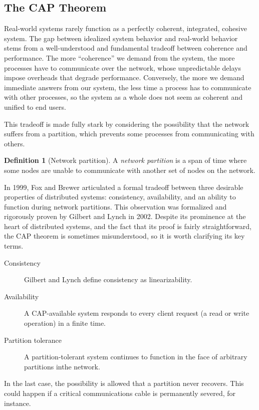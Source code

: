 \documentclass[]             %
{NASA}                       %
\theoremstyle{definition}
\newtheorem{definition}[theorem]{Definition}
\begin{document}
\subsection{The CAP Theorem}
Real-world systems rarely function as a perfectly coherent,
integrated, cohesive system. The gap between idealized system behavior
and real-world behavior stems from a well-understood and fundamental
tradeoff between coherence and performance. The more ``coherence'' we
demand from the system, the more processes have to communicate over
the network, whose unpredictable delays impose overheads that degrade
performance. Conversely, the more we demand immediate answers from our
system, the less time a process has to communicate with other
processes, so the system as a whole does not seem as coherent and
unified to end users.

This tradeoff is made fully stark by considering the possibility that
the network suffers from a partition, which prevents some processes
from communicating with others.

\begin{definition}[Network partition] A \emph{network partition} is a
span of time where some nodes are unable to communicate with another
set of nodes on the network.
\end{definition}

In 1999, Fox and Brewer \cite{1999foxbrewer} articulated a formal
tradeoff between three desirable properties of distributed systems:
consistency, availability, and an ability to function during network
partitions. This observation was formalized and rigorously proven by
Gilbert and Lynch \cite{2002gilbertlynchCAP} in 2002. Despite its
prominence at the heart of distributed systems, and the fact that its
proof is fairly straightforward, the CAP theorem is sometimes
misunderstood, so it is worth clarifying its key terms.

\begin{description}
\item[Consistency] Gilbert and Lynch define consistency as
  linearizability.
\item[Availability] A CAP-available system responds to every client
  request (a read or write operation) in a finite time.
\item[Partition tolerance] A partition-tolerant system continues to
  function in the face of arbitrary partitions inthe network.
\end{description}

In the last case, the possibility is allowed that a partition never
recovers. This could happen if a critical communications cable is
permanently severed, for instance.
\end{document}
